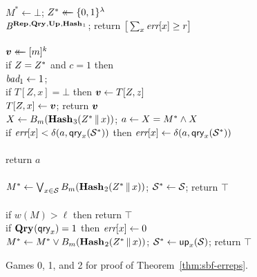 \begin{figure*}
{
  \vspace{-7pt}
  \hfill {}\\[2pt]
    $M^* \gets \bot$;
    $Z^* \mathrel{\leftarrow\mkern-14mu\leftarrow} \{0,1\}^\lambda$\\
    $\mathit{B}^{\textup{\textbf{Rep}}\hspace{0.5pt},\textup{\textbf{Qry}}\hspace{0.5pt},\textup{\textbf{Up}}\hspace{0.5pt},\textup{\textbf{Hash}}\hspace{0.5pt}_1}$;
    return $\big[\sum_x \textit{err}[x] \geq r\big]$
  \\[6pt]
  \\[2pt]
    $\boldsymbol{v} \mathrel{\leftarrow\mkern-14mu\leftarrow} [m]^k$\\
    if $Z=Z^*$ and $c = 1$ then \\
    \tab $\textit{bad}_1 \gets 1$; \\
    if $T[Z,x] = \bot$ then $\boldsymbol{v} \gets T[Z,z]$\\
    $T[Z,x] \gets \boldsymbol{v}$; return $\boldsymbol{v}$
}
{
  \\[2pt]
    $X \gets {B}_m(\textup{\textbf{Hash}}\hspace{0.5pt}_3(Z^* \, \| \, x))$;
    $a \gets X = M^* \wedge X$\\
    if $\textit{err}[x] < \delta(a,\mathsf{qry}_x(\mathcal{S}^*))$ then
          $\textit{err}[x] \gets \delta(a,\mathsf{qry}_x(\mathcal{S}^*))$\\
    \\
    return $a$
  \\[6pt]
  \oraclev{$\REPO(\col)$}\\[2pt]
    $M^* \gets \bigvee_{x \in \mathcal{S}} {B}_m(\textup{\textbf{Hash}}\hspace{0.5pt}_2(Z^* \, \| \, x))$;
    $\mathcal{S}^* \gets \mathcal{S}$;
    return $\top$
  \\[6pt]
  \\[2pt]
    if $w(M) > \ell$ then return $\top$\\
    if $\textup{\textbf{Qry}}\hspace{0.5pt}(\mathsf{qry}_x) = 1$ then $\textit{err}[x] \gets 0$\\
    $M^* \gets M^* \vee {B}_m(\textup{\textbf{Hash}}\hspace{0.5pt}_2(Z^* \, \| \, x))$;
    $\mathcal{S}^* \gets \mathsf{up}_x(\mathcal{S})$;
    return $\top$
}
\caption{Games 0, 1, and 2 for proof of Theorem~\ref{thm:sbf-erreps}.}
\label{fig:sbf-erreps/games}
\end{figure*}

